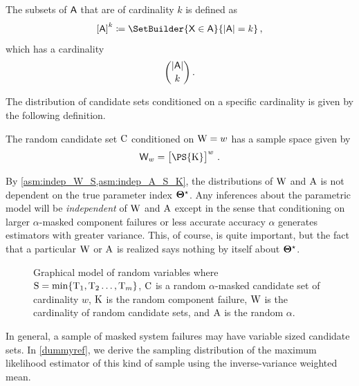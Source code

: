 \documentclass[
    11pt,
    extrafontsizes,
    article,
    oldfontcommands,
    final,
    oneside,
    openany,
    hidelinks]{memoir}
\begin{document}
\begin{definition}
	The subsets of $\Set{A}$ that are of cardinality $k$ is defined as
	\begin{equation}
	\left[\Set{A}\right]^k \coloneqq \SetBuilder{\Set{X} \in \Set{A}}{\Card{\Set{A}} = k}\,,
	\end{equation}
	which has a cardinality
	\begin{equation}
	\binom{\Card{\Set{A}}}{k}\,.
	\end{equation}
\end{definition}

The distribution of candidate sets conditioned on a specific cardinality is given by the following definition.
\begin{definition}
	The random candidate set $\mathrm{C}$ conditioned on $\mathrm{W} = w$ has a sample space given by
	\begin{equation}
	\candsw{w} = \left[\PS{\RV{K}}\right]^w\,.
	\end{equation}
\end{definition}
By \cref{asm:indep_W_S,asm:indep_A_S_K}, the distributions of $\mathrm{W}$ and $\mathrm{A}$ is not dependent on the true parameter index ${\boldsymbol{\Theta}}^{\star}$.
Any inferences about the parametric model will be \emph{independent} of $\mathrm{W}$ and $\mathrm{A}$ except in the sense that conditioning on larger $\alpha$-masked component failures or less accurate accuracy $\alpha$ generates estimators with greater variance.
This, of course, is quite important, but the fact that a particular $\mathrm{W}$ or $\mathrm{A}$ is realized says nothing by itself about ${\boldsymbol{\Theta}}^{\star}$.


\begin{figure}
	\label{fig:gen_model_alpha}
	\caption{Graphical model of random variables where $\mathrm{S} = \min\{\mathrm{T}_1,\mathrm{T}_2\ldots,\mathrm{T}_m\}$, $\mathrm{C}$ is a random $\alpha$-masked candidate set of cardinality $w$, $\mathrm{K}$ is the random component failure, $\mathrm{W}$ is the cardinality of random candidate sets, and $\mathrm{A}$ is the random $\alpha$.}
	\begin{center}
		
	\end{center}
\end{figure}
In general, a sample of masked system failures may have variable sized candidate sets. In \cref{dummyref}, we derive the sampling distribution of the maximum likelihood estimator of this kind of sample using the inverse-variance weighted mean.
\end{document}
